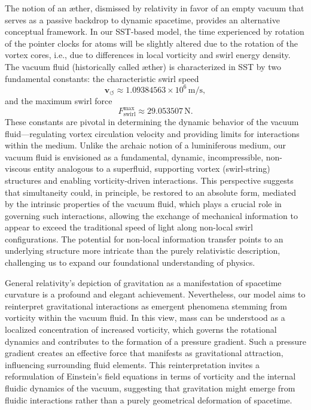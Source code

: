 \documentclass[10pt,reprint,aps,onecolumn,nofootinbib]{revtex4-2}
\begin{document}
            The notion of an æther, dismissed by relativity in favor of an empty vacuum that serves as a passive backdrop to dynamic spacetime, provides an alternative conceptual framework. In our SST-based model, the time experienced by rotation of the pointer clocks for atoms will be slightly altered due to the rotation of the vortex cores, i.e., due to differences in local vorticity and swirl energy density. The vacuum fluid (historically called æther) is characterized in SST by two fundamental constants: the characteristic swirl speed
            \[
                \mathbf{v}_{\!\boldsymbol{\circlearrowleft}} \approx 1.09384563 \times 10^{6}\,\mathrm{m/s},
            \]
            and the maximum swirl force
            \[
                F_{\text{swirl}}^{\max} \approx 29.053507\,\mathrm{N}.
            \]
            These constants are pivotal in determining the dynamic behavior of the vacuum fluid---regulating vortex circulation velocity and providing limits for interactions within the medium. Unlike the archaic notion of a luminiferous medium, our vacuum fluid is envisioned as a fundamental, dynamic, incompressible, non-viscous entity analogous to a superfluid, supporting vortex (swirl-string) structures and enabling vorticity-driven interactions. This perspective suggests that simultaneity could, in principle, be restored to an absolute form, mediated by the intrinsic properties of the vacuum fluid, which plays a crucial role in governing such interactions, allowing the exchange of mechanical information to appear to exceed the traditional speed of light along non-local swirl configurations. The potential for non-local information transfer points to an underlying structure more intricate than the purely relativistic description, challenging us to expand our foundational understanding of physics.

            General relativity's depiction of gravitation as a manifestation of spacetime curvature is a profound and elegant achievement.\cite{Einstein1916} Nevertheless, our model aims to reinterpret gravitational interactions as emergent phenomena stemming from vorticity within the vacuum fluid. In this view, mass can be understood as a localized concentration of increased vorticity, which governs the rotational dynamics and contributes to the formation of a pressure gradient. Such a pressure gradient creates an effective force that manifests as gravitational attraction, influencing surrounding fluid elements. This reinterpretation invites a reformulation of Einstein's field equations in terms of vorticity and the internal fluidic dynamics of the vacuum, suggesting that gravitation might emerge from fluidic interactions rather than a purely geometrical deformation of spacetime.
\end{document}
